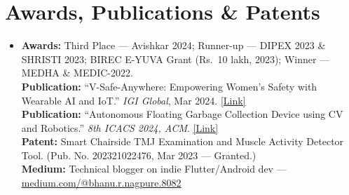 \documentclass[letterpaper,10pt]{article}
\newcommand{\resumeSubHeadingListStart}{\begin{itemize}[leftmargin=0.13in, label={}]}
\newcommand{\resumeSubHeadingListEnd}{\end{itemize}}
\begin{document}
\section{Awards, Publications \& Patents}
\resumeSubHeadingListStart
  \item\small{
    \textbf{Awards:} Third Place --- Avishkar 2024; Runner-up --- DIPEX 2023 \& SHRISTI 2023; BIREC E-YUVA Grant (Rs.~10 lakh, 2023); Winner --- MEDHA \& MEDIC-2022. \\[1pt]
    \textbf{Publication:} ``V-Safe-Anywhere: Empowering Women's Safety with Wearable AI and IoT.'' \textit{IGI Global}, Mar 2024. \href{https://www.igi-global.com/chapter/v-safe-anywhere/342150}{\underline{[Link]}} \\[1pt]
    \textbf{Publication:} ``Autonomous Floating Garbage Collection Device using CV and Robotics.'' \textit{8th ICACS 2024, ACM}. \href{https://dl.acm.org/doi/10.1145/3693939.3693957}{\underline{[Link]}} \\[1pt]
    \textbf{Patent:} Smart Chairside TMJ Examination and Muscle Activity Detector Tool. (Pub. No. 202321022476, Mar 2023 --- Granted.) \\[1pt]
    \textbf{Medium:} Technical blogger on indie Flutter/Android dev --- \href{https://medium.com/@bhanu.r.nagpure.8082}{\underline{medium.com/@bhanu.r.nagpure.8082}}
  }
\resumeSubHeadingListEnd
\end{document}

